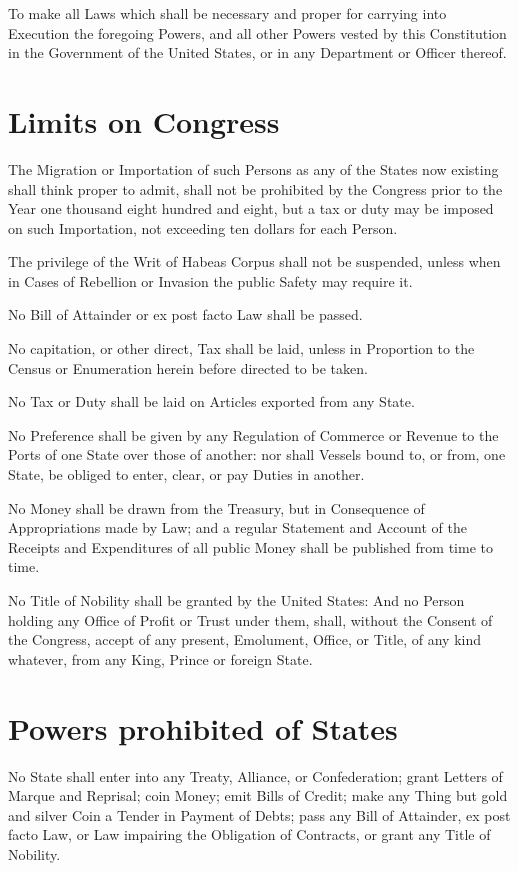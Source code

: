 \documentclass{constitution}
\begin{document}
To make all Laws which shall be necessary and proper for carrying into Execution the foregoing Powers,
and all other Powers vested by this Constitution in the Government of the United States,
or in any Department or Officer thereof.

\section{Limits on Congress}
The Migration or Importation of such Persons as any of the States now existing shall think proper to admit, shall not be prohibited by the Congress prior to the Year one thousand eight hundred and eight,
but a tax or duty may be imposed on such Importation, not exceeding ten dollars for each Person.

The privilege of the Writ of Habeas Corpus shall not be suspended,
unless when in Cases of Rebellion or Invasion the public Safety may require it.

No Bill of Attainder or ex post facto Law shall be passed.

No capitation, or other direct, Tax shall be laid,
unless in Proportion to the Census or Enumeration herein before directed to be taken.

No Tax or Duty shall be laid on Articles exported from any State.

No Preference shall be given by any Regulation of Commerce or Revenue to the Ports of one State over those of another:
nor shall Vessels bound to, or from, one State, be obliged to enter, clear, or pay Duties in another.

No Money shall be drawn from the Treasury, but in Consequence of Appropriations made by Law;
and a regular Statement and Account of the Receipts and Expenditures of all public Money shall be published from time to time.

No Title of Nobility shall be granted by the United States:
And no Person holding any Office of Profit or Trust under them, shall, without the Consent of the Congress, accept of any present, Emolument, Office, or Title, of any kind whatever, from any King, Prince or foreign State.

\section{Powers prohibited of States}
No State shall enter into any Treaty, Alliance, or Confederation;
grant Letters of Marque and Reprisal;
coin Money;
emit Bills of Credit;
make any Thing but gold and silver Coin a Tender in Payment of Debts;
pass any Bill of Attainder, ex post facto Law, or Law impairing the Obligation of Contracts,
or grant any Title of Nobility.
\end{document}
